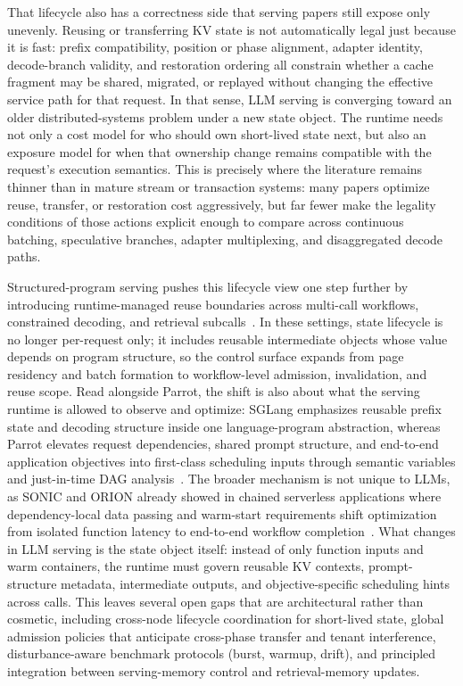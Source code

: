 \documentclass[acmsmall,screen,review]{acmart}
\begin{document}
That lifecycle also has a correctness side that serving papers still expose only unevenly. Reusing or transferring KV state is not automatically legal just because it is fast: prefix compatibility, position or phase alignment, adapter identity, decode-branch validity, and restoration ordering all constrain whether a cache fragment may be shared, migrated, or replayed without changing the effective service path for that request. In that sense, LLM serving is converging toward an older distributed-systems problem under a new state object. The runtime needs not only a cost model for who should own short-lived state next, but also an exposure model for when that ownership change remains compatible with the request's execution semantics. This is precisely where the literature remains thinner than in mature stream or transaction systems: many papers optimize reuse, transfer, or restoration cost aggressively, but far fewer make the legality conditions of those actions explicit enough to compare across continuous batching, speculative branches, adapter multiplexing, and disaggregated decode paths.

Structured-program serving pushes this lifecycle view one step further by introducing runtime-managed reuse boundaries across multi-call workflows, constrained decoding, and retrieval subcalls~\cite{zheng2023sglang}. In these settings, state lifecycle is no longer per-request only; it includes reusable intermediate objects whose value depends on program structure, so the control surface expands from page residency and batch formation to workflow-level admission, invalidation, and reuse scope. Read alongside Parrot, the shift is also about what the serving runtime is allowed to observe and optimize: SGLang emphasizes reusable prefix state and decoding structure inside one language-program abstraction, whereas Parrot elevates request dependencies, shared prompt structure, and end-to-end application objectives into first-class scheduling inputs through semantic variables and just-in-time DAG analysis~\cite{zheng2023sglang,lin2024parrot}. The broader mechanism is not unique to LLMs, as SONIC and ORION already showed in chained serverless applications where dependency-local data passing and warm-start requirements shift optimization from isolated function latency to end-to-end workflow completion~\cite{mahgoub2021sonic,mahgoub2022orion}. What changes in LLM serving is the state object itself: instead of only function inputs and warm containers, the runtime must govern reusable KV contexts, prompt-structure metadata, intermediate outputs, and objective-specific scheduling hints across calls. This leaves several open gaps that are architectural rather than cosmetic, including cross-node lifecycle coordination for short-lived state, global admission policies that anticipate cross-phase transfer and tenant interference, disturbance-aware benchmark protocols (burst, warmup, drift), and principled integration between serving-memory control and retrieval-memory updates.
\end{document}
